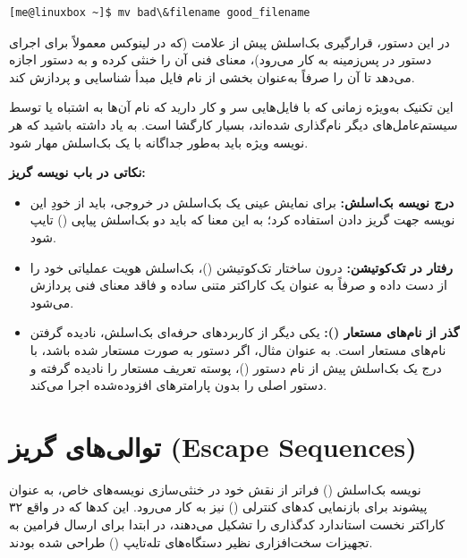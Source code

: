 \begin{latin}
\begin{lstlisting}
[me@linuxbox ~]$ mv bad\&filename good_filename
\end{lstlisting}
\end{latin}

در این دستور، قرارگیری بک‌اسلش پیش از علامت \cmd{\&} (که در لینوکس معمولاً برای اجرای دستور در پس‌زمینه به کار می‌رود)، معنای فنی آن را خنثی کرده و به دستور  اجازه می‌دهد تا آن را صرفاً به‌عنوان بخشی از نام فایل مبدأ شناسایی و پردازش کند.

این تکنیک به‌ویژه زمانی که با فایل‌هایی سر و کار دارید که نام آن‌ها به اشتباه یا توسط سیستم‌عامل‌های دیگر نام‌گذاری شده‌اند، بسیار کارگشا است. به یاد داشته باشید که هر نویسه ویژه باید به‌طور جداگانه با یک بک‌اسلش مهار شود.

\textbf{نکاتی در باب نویسه گریز:}

\begin{itemize}
  \item \textbf{درج نویسه بک‌اسلش:} برای نمایش عینی یک بک‌اسلش در خروجی، باید از خودِ این نویسه جهت گریز دادن استفاده کرد؛ به این معنا که باید دو بک‌اسلش پیاپی (\cmd{\textbackslash\textbackslash}) تایپ شود.
  \item \textbf{رفتار در تک‌کوتیشن:} درون ساختار تک‌کوتیشن ()، بک‌اسلش هویت عملیاتی خود را از دست داده و صرفاً به عنوان یک کاراکتر متنی ساده و فاقد معنای فنی پردازش می‌شود.
  \item \textbf{گذر از نام‌های مستعار ():} یکی دیگر از کاربردهای حرفه‌ای بک‌اسلش، نادیده گرفتن نام‌های مستعار است. به عنوان مثال، اگر دستور  به صورت  مستعار شده باشد، با درج یک بک‌اسلش پیش از نام دستور ()، پوسته تعریف مستعار را نادیده گرفته و دستور اصلی را بدون پارامترهای افزوده‌شده اجرا می‌کند.
\end{itemize}

\section{توالی‌های گریز (Escape Sequences)}

نویسه بک‌اسلش (\cmd{\textbackslash}) فراتر از نقش خود در خنثی‌سازی نویسه‌های خاص، به عنوان پیشوند برای بازنمایی کدهای کنترلی () نیز به کار می‌رود. این کدها که در واقع ۳۲ کاراکتر نخست استاندارد کدگذاری  را تشکیل می‌دهند، در ابتدا برای ارسال فرامین به تجهیزات سخت‌افزاری نظیر دستگاه‌های تله‌تایپ () طراحی شده بودند.

